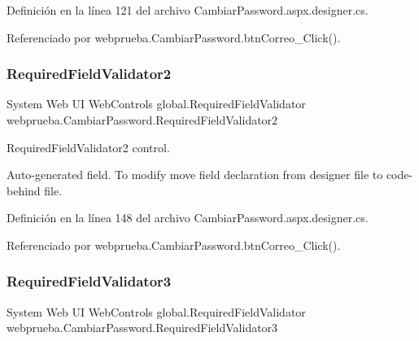 Definición en la línea 121 del archivo Cambiar\+Password.\+aspx.\+designer.\+cs.



Referenciado por webprueba.\+Cambiar\+Password.\+btn\+Correo\+\_\+\+Click().

\mbox{\label{classwebprueba_1_1_cambiar_password_a961a06f8d25322b712d493b0beaed825}} 
\subsubsection{\texorpdfstring{RequiredFieldValidator2}{RequiredFieldValidator2}}
{\footnotesize\ttfamily System Web UI Web\+Controls global.\+Required\+Field\+Validator webprueba.\+Cambiar\+Password.\+Required\+Field\+Validator2\hspace{0.3cm}{\ttfamily [protected]}}



Required\+Field\+Validator2 control. 

Auto-\/generated field. To modify move field declaration from designer file to code-\/behind file. 

Definición en la línea 148 del archivo Cambiar\+Password.\+aspx.\+designer.\+cs.



Referenciado por webprueba.\+Cambiar\+Password.\+btn\+Correo\+\_\+\+Click().

\mbox{\label{classwebprueba_1_1_cambiar_password_a598719ee05f318e2afcc63bc2fcfc627}} 
\subsubsection{\texorpdfstring{RequiredFieldValidator3}{RequiredFieldValidator3}}
{\footnotesize\ttfamily System Web UI Web\+Controls global.\+Required\+Field\+Validator webprueba.\+Cambiar\+Password.\+Required\+Field\+Validator3\hspace{0.3cm}{\ttfamily [protected]}}



